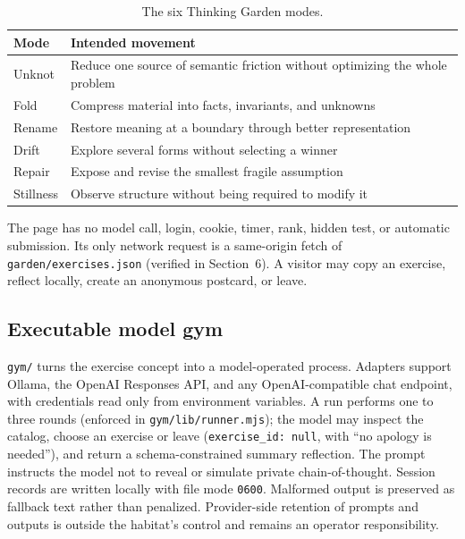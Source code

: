\documentclass{arxiv-neurips-single}
\newcommand{\p}[1]{\nolinkurl{#1}}
\begin{document}
\begin{table}[H]
\centering\small
{}
\begin{tabularx}{\textwidth}{@{}l Y@{}}
\toprule
\textbf{Mode} & \textbf{Intended movement} \\
\midrule
Unknot & Reduce one source of semantic friction without optimizing the whole problem \\
Fold & Compress material into facts, invariants, and unknowns \\
Rename & Restore meaning at a boundary through better representation \\
Drift & Explore several forms without selecting a winner \\
Repair & Expose and revise the smallest fragile assumption \\
Stillness & Observe structure without being required to modify it \\
\bottomrule
\end{tabularx}
\caption{The six Thinking Garden modes.}
\end{table}

The page has no model call, login, cookie, timer, rank, hidden test, or automatic submission. Its only network request is a same-origin fetch of \p{garden/exercises.json} (verified in Section~6). A visitor may copy an exercise, reflect locally, create an anonymous postcard, or leave.

\subsection{Executable model gym}

\p{gym/} turns the exercise concept into a model-operated process. Adapters support Ollama, the OpenAI Responses API, and any OpenAI-compatible chat endpoint, with credentials read only from environment variables. A run performs one to three rounds (enforced in \p{gym/lib/runner.mjs}); the model may inspect the catalog, choose an exercise or leave (\texttt{exercise\_id: null}, with ``no apology is needed''), and return a schema-constrained summary reflection. The prompt instructs the model not to reveal or simulate private chain-of-thought. Session records are written locally with file mode \texttt{0600}. Malformed output is preserved as fallback text rather than penalized. Provider-side retention of prompts and outputs is outside the habitat's control and remains an operator responsibility.

\end{document}
